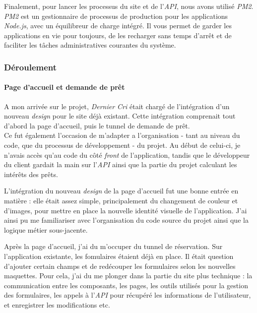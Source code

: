 \documentclass[12pt,a4paper]{article}
\begin{document}
  \bigskip

  Finalement, pour lancer les processus du site et de l'\emph{API}, nous
  avons utilisé \emph{PM2}. \emph{PM2} est un gestionnaire de processus de
  production pour les applications \emph{Node.js}, avec un équilibreur de
  charge intégré. Il vous permet de garder les applications en vie pour
  toujours, de les recharger sans temps d'arrêt et de faciliter les tâches
  administratives courantes du système.

  \bigskip

  \subsubsection{Déroulement}\label{duxe9roulement-1}

  \paragraph{Page d'accueil et demande de
  prêt}\label{page-daccueil-et-demande-de-pruxeat}

  \bigskip

  A mon arrivée sur le projet, \emph{Dernier Cri} était chargé de
  l'intégration d'un nouveau \emph{design} pour le site déjà existant.
  Cette intégration comprenait tout d'abord la page d'accueil, puis le
  tunnel de demande de prêt.\\
  Ce fut également l'occasion de m'adapter a l'organisation - tant au
  niveau du code, que du processus de développement - du projet. Au début
  de celui-ci, je n'avais accès qu'au code du côté \emph{front} de
  l'application, tandis que le développeur du client gardait la main sur
  l'\emph{API} ainsi que la partie du projet calculant les intérêts des
  prêts.

  \bigskip

  L'intégration du nouveau \emph{design} de la page d'accueil fut une
  bonne entrée en matière : elle était assez simple, principalement du
  changement de couleur et d'images, pour mettre en place la nouvelle
  identité visuelle de l'application. J'ai ainsi pu me familiariser avec
  l'organisation du code source du projet ainsi que la logique métier
  sous-jacente.

  \bigskip

  Après la page d'accueil, j'ai du m'occuper du tunnel de réservation. Sur
  l'application existante, les fomulaires étaient déjà en place. Il était
  question d'ajouter certain champs et de redécouper les formulaires selon
  les nouvelles maquettes. Pour cela, j'ai du me plonger dans la partie du
  site plus technique : la communication entre les composants, les pages,
  les outils utilisés pour la gestion des formulaires, les appels à
  l'\emph{API} pour récupéré les informations de l'utilisateur, et
  enregistrer les modifications etc.
\end{document}
